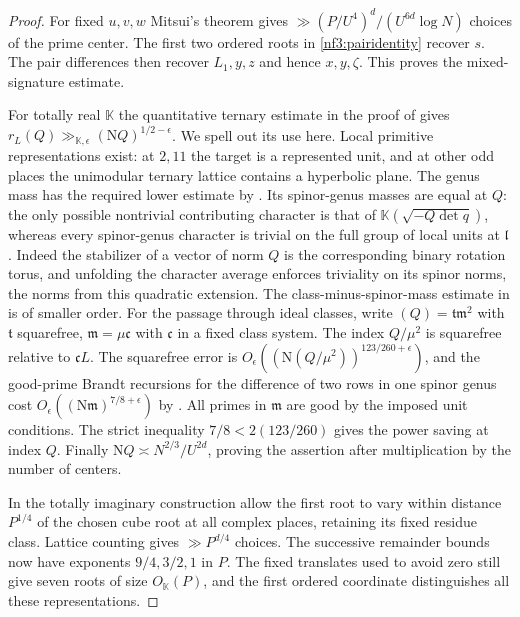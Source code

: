 \documentclass[11pt,letterpaper]{article}
\theoremstyle{definition}
\numberwithin{equation}{section}
\begin{document}
\begin{proof}
For fixed $u,v,w$ Mitsui's theorem gives
$\gg(P/U^4)^d/(U^{6d}\log N)$ choices of the prime center.
The first two ordered roots in \eqref{nf3:pairidentity} recover
$s$. The pair differences then recover $L_1,y,z$ and hence
$x,y,\zeta$. This proves the mixed-signature estimate.

For totally real $\mathbb K$ the quantitative ternary estimate in
the proof of \cite[Corollary~5.6]{nf3:schulzesurvey} gives
$r_L(Q)\gg_{\mathbb K,\epsilon}(\mathrm NQ)^{1/2-\epsilon}$.
We spell out its use here. Local primitive representations exist:
at $2,11$ the target is a represented unit, and at other odd places
the unimodular ternary lattice contains a hyperbolic plane.
The genus mass has the required lower estimate by
\cite[Lemma~2.1]{nf3:schulzesurvey}. Its spinor-genus masses are
equal at $Q$: the only possible nontrivial contributing character
is that of $\mathbb K(\sqrt{-Q\det q})$, whereas every spinor-genus
character is trivial on the full group of local units at
$\mathfrak l$. Indeed the stabilizer of a vector of norm $Q$ is
the corresponding binary rotation torus, and unfolding the character
average enforces triviality on its spinor norms, the norms from
this quadratic extension. The class-minus-spinor-mass estimate
in \cite[Theorem~5.2, Lemma~5.4 and proof of Corollary~5.6]{nf3:schulzesurvey}
is of smaller order. For the passage through ideal classes, write
$(Q)=\mathfrak t\mathfrak m^2$ with $\mathfrak t$ squarefree,
$\mathfrak m=\mu\mathfrak c$ with $\mathfrak c$ in a fixed class
system. The index $Q/\mu^2$ is squarefree relative to
$\mathfrak c L$. The squarefree error is
$O_\epsilon((\mathrm N(Q/\mu^2))^{123/260+\epsilon})$, and the
good-prime Brandt recursions for the difference of two rows in
one spinor genus cost $O_\epsilon((\mathrm N\mathfrak m)^{7/8+\epsilon})$
by \cite[pp.~120--122]{nf3:brandt}. All primes in $\mathfrak m$ are
good by the imposed unit conditions. The strict inequality
$7/8<2(123/260)$ gives the power saving at index $Q$. Finally
$\mathrm NQ\asymp N^{2/3}/U^{2d}$, proving the assertion after
multiplication by the number of centers.

In the totally imaginary construction allow the first root to vary
within distance $P^{1/4}$ of the chosen cube root at all complex
places, retaining its fixed residue class. Lattice counting gives
$\gg P^{d/4}$ choices. The successive remainder bounds now have
exponents $9/4,3/2,1$ in $P$. The fixed translates used to avoid
zero still give seven roots of size $O_{\mathbb K}(P)$, and the
first ordered coordinate distinguishes all these representations.
\end{proof}
\end{document}
